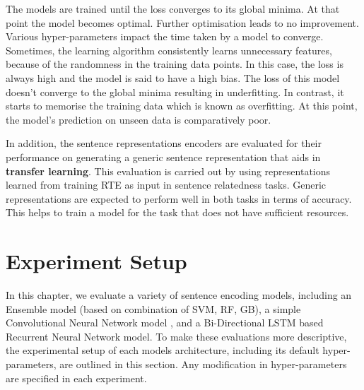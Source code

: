 \documentclass[12pt]{report} %
\begin{document}
 The models are trained until the loss converges to its global minima. At that point the model becomes optimal. Further optimisation leads to no improvement. Various hyper-parameters impact the time taken by a model to converge. Sometimes, the learning algorithm consistently learns unnecessary features, because of the randomness in the training data points. In this case, the loss is always high and the model is said to have a high bias. The loss of this model doesn't converge to the global minima resulting in underfitting. In contrast, it starts to memorise the training data which is known as overfitting. At this point, the model's prediction on unseen data is comparatively poor.   
 
 In addition, the sentence representations encoders are evaluated for their performance on generating a generic sentence representation that aids in \textbf{transfer learning}. This evaluation is carried out by using representations learned from training RTE as input in sentence relatedness tasks. Generic representations are expected to perform well in both tasks in terms of accuracy. This helps to train a model for the task that does not have sufficient resources.  
 
 \section{Experiment Setup}
 \label{exp_setup}
 
 In this chapter, we evaluate a variety of sentence encoding models,
 including an Ensemble model (based on combination of SVM, RF, GB), a simple Convolutional Neural Network model , and a Bi-Directional LSTM based Recurrent Neural Network model. To make these evaluations more descriptive, the experimental setup of each models architecture, including its default hyper-parameters, are outlined in this section. Any modification in hyper-parameters are specified in each experiment.
 
\end{document}

